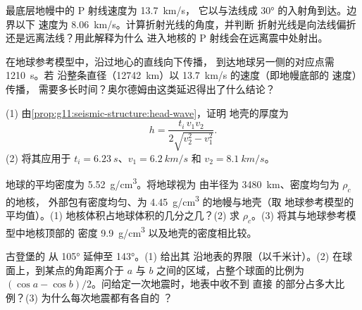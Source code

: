 \begin{exercise}[$\star\star$]\label{exo:g11:seismic-structure:10}
最底层地幔中的 P 射线速度为 \qty{13.7}{km/s}，
它以与法线成 \ang{30} 的入射角到达。边界以下
速度为 \qty{8.06}{km/s}。计算折射光线的角度，并判断
折射光线是向法线偏折还是远离法线？用此解释为什么
进入地核的 P 射线会在远离震中处射出。
\end{exercise}

\begin{exercise}[$\star\star$]\label{exo:g11:seismic-structure:11}
在地球参考模型中，沿过地心的直线向下传播，
到达地球另一侧的对应点需 \qty{1210}{s}。若
沿整条直径（\qty{12742}{km}）以 \qty{13.7}{km/s} 的速度（即地幔底部的 速度）传播，
需要多长时间？奥尔德姆由这类延迟得出了什么结论？
\end{exercise}

\begin{exercise}[$\star\star\star$]\label{exo:g11:seismic-structure:12}
(1) 由\cref{prop:g11:seismic-structure:head-wave}，证明
地壳的厚度为
\[
  h = \frac{t_i\,v_1 v_2}{2\sqrt{v_2^2 - v_1^2}}.
\]
(2) 将其应用于 $t_i = \qty{6.23}{s}$、$v_1 = \qty{6.2}{km/s}$ 和
$v_2 = \qty{8.1}{km/s}$。
\end{exercise}

\begin{exercise}[$\star\star\star$]\label{exo:g11:seismic-structure:13}
地球的平均密度为 \qty{5.52}{g/cm^3}。将地球视为
由半径为 \qty{3480}{km}、密度均匀为 $\rho_c$ 的地核，
外部包有密度均匀、为 \qty{4.45}{g/cm^3} 的地幔与地壳（取
地球参考模型的平均值）。(1) 地核体积占地球体积的几分之几？(2) 求
$\rho_c$。(3) 将其与地球参考模型中地核顶部的
密度 \qty{9.9}{g/cm^3} 以及地壳的密度相比较。
\end{exercise}

\begin{exercise}[$\star\star\star$]\label{exo:g11:seismic-structure:14}
古登堡的 从 \ang{105} 延伸至 \ang{143}。(1) 给出其
沿地表的界限（以千米计）。(2) 在球面上，到某点的角距离介于
$a$ 与 $b$ 之间的区域，占整个球面的比例为 $(\cos a - \cos
b)/2$。问给定一次地震时，地表中收不到
直接 的部分占多大比例？(3) 为什么每次地震都有各自的
？
\end{exercise}

